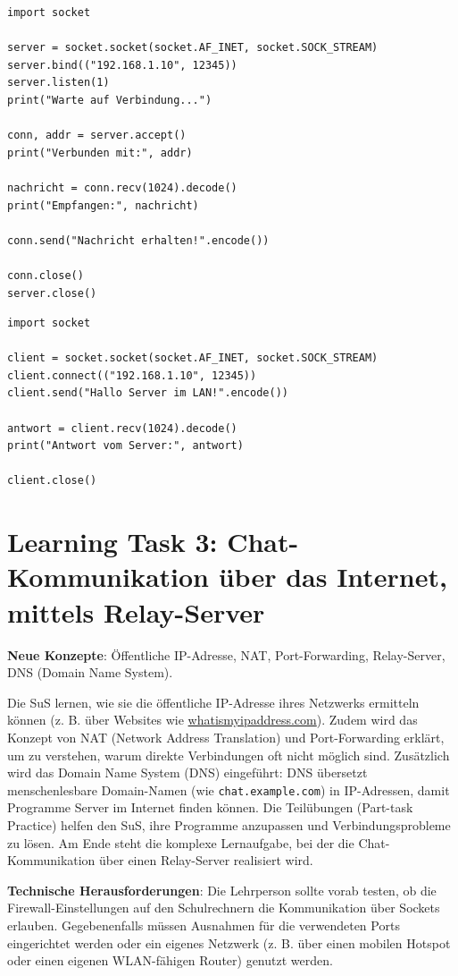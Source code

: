 \begin{myexercise}
    \begin{myanswer}
        \begin{lstlisting}[caption=\texttt{server.py}]
import socket

server = socket.socket(socket.AF_INET, socket.SOCK_STREAM)
server.bind(("192.168.1.10", 12345))
server.listen(1)
print("Warte auf Verbindung...")

conn, addr = server.accept()
print("Verbunden mit:", addr)

nachricht = conn.recv(1024).decode()
print("Empfangen:", nachricht)

conn.send("Nachricht erhalten!".encode())

conn.close()
server.close()
        \end{lstlisting}
        \begin{lstlisting}[caption=\texttt{client.py}]
import socket

client = socket.socket(socket.AF_INET, socket.SOCK_STREAM)
client.connect(("192.168.1.10", 12345))
client.send("Hallo Server im LAN!".encode())

antwort = client.recv(1024).decode()
print("Antwort vom Server:", antwort)

client.close()
        \end{lstlisting}
    \end{myanswer}
\end{myexercise}

\section{Learning Task 3: Chat-Kommunikation über das Internet, mittels Relay-Server}

\begin{scaffoldBox}
    \textbf{Neue Konzepte}: Öffentliche IP-Adresse, NAT, Port-Forwarding, Relay-Server, DNS (Domain Name System).

    Die SuS lernen, wie sie die öffentliche IP-Adresse ihres Netzwerks ermitteln können (z. B. über Websites wie \href{https://whatismyipaddress.com/}{whatismyipaddress.com}). Zudem wird das Konzept von NAT (Network Address Translation) und Port-Forwarding erklärt, um zu verstehen, warum direkte Verbindungen oft nicht möglich sind. Zusätzlich wird das Domain Name System (DNS) eingeführt: DNS übersetzt menschenlesbare Domain-Namen (wie \texttt{chat.example.com}) in IP-Adressen, damit Programme Server im Internet finden können. Die Teilübungen (Part-task Practice) helfen den SuS, ihre Programme anzupassen und Verbindungsprobleme zu lösen. Am Ende steht die komplexe Lernaufgabe, bei der die Chat-Kommunikation über einen Relay-Server realisiert wird.

    \textbf{Technische Herausforderungen}: Die Lehrperson sollte vorab testen, ob die Firewall-Einstellungen auf den Schulrechnern die Kommunikation über Sockets erlauben. Gegebenenfalls müssen Ausnahmen für die verwendeten Ports eingerichtet werden oder ein eigenes Netzwerk (z. B. über einen mobilen Hotspot oder einen eigenen WLAN-fähigen Router) genutzt werden.
\end{scaffoldBox}

